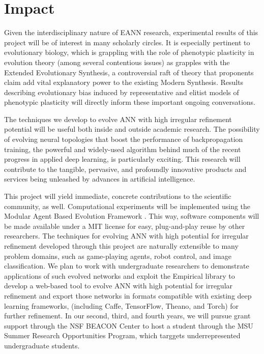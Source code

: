 \section{Impact}

Given the interdisciplinary nature of EANN research, experimental results of this project will be of interest in many scholarly circles.
It is especially pertinent to evolutionary biology, which is grappling with the role of phenotypic plasticity in evolution theory (among several contentious issues) as grapples with the Extended Evolutionary Synthesis, a controversial raft of theory that proponents claim add vital explanatory power to the existing Modern Synthesis.\autocite{Pigliucci2008IsEvolvable, Laland2014DoesRethink}
Results describing evolutionary bias induced by representative and elitist models of phenotypic plasticity will directly inform these important ongoing conversations.

The techniques we develop to evolve ANN with high irregular refinement potential will be useful both inside and outside academic research.
The possibility of evolving neural topologies that boost the performance of backpropagation training, the powerful and widely-used algorithm behind much of the recent progress in applied deep learning, is particularly exciting.
This research will contribute to the tangible, pervasive, and profoundly innovative products and services being unleashed by advances in artificial intelligence.

This project will yield immediate, concrete contributions to the scientific community, as well.
Computational experiments will be implemented using the Modular Agent Based Evolution Framework \autocite{Hintze2017Mabe}.
This way, software components will be made available under a MIT license for easy, plug-and-play reuse by other researchers.
The techniques for evolving ANN with high potential for irregular refinement developed through this project are naturally extensible to many problem domains, such as game-playing agents, robot control, and image classification.
We plan to work with undergraduate researchers to demonstrate applications of such evolved networks and exploit the Empirical library to develop a web-based tool to evolve ANN with high potential for irregular refinement and export those networks in formats compatible with existing deep learning frameworks, (including Caffe, TensorFlow, Theano, and Torch) for further refinement.
In our second, third, and fourth years, we will pursue grant support through the NSF BEACON Center to host a student through the MSU Summer Research Opportunities Program, which targgets underrepresented undergraduate students.
